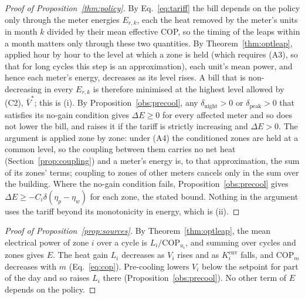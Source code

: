 \documentclass[10pt,a4paper,twocolumn]{article}
\theoremstyle{definition}
\begin{document}
\begin{proof}[Proof of Proposition~\ref{thm:policy}]
By Eq.~\eqref{eq:tariff} the bill depends on the policy only through the meter energies $E_{r,k}$, each the heat removed by the meter's units in month $k$ divided by their mean effective COP, so the timing of the leaps within a month matters only through these two quantities. By Theorem~\ref{thm:optleap}, applied hour by hour to the level at which a zone is held (which requires (A3), so that for long cycles this step is an approximation), each unit's mean power, and hence each meter's energy, decreases as its level rises. A bill that is non-decreasing in every $E_{r,k}$ is therefore minimised at the highest level allowed by (C2), $\bar V^\ast$; this is (i). By Proposition~\ref{obs:precool}, any $\delta_{\text{night}}>0$ or $\delta_{\text{peak}}>0$ that satisfies its no-gain condition gives $\Delta E\ge0$ for every affected meter and so does not lower the bill, and raises it if the tariff is strictly increasing and $\Delta E>0$. The argument is applied zone by zone: under (A4) the conditioned zones are held at a common level, so the coupling between them carries no net heat (Section~\ref{prop:coupling}) and a meter's energy is, to that approximation, the sum of its zones' terms; coupling to zones of other meters cancels only in the sum over the building. Where the no-gain condition fails, Proposition~\ref{obs:precool} gives $\Delta E\ge-C_i\delta(\eta_p-\eta_w)$ for each zone, the stated bound. Nothing in the argument uses the tariff beyond its monotonicity in energy, which is (ii).
\end{proof}

\begin{proof}[Proof of Proposition~\ref{prop:sources}]
By Theorem~\ref{thm:optleap}, the mean electrical power of zone $i$ over a cycle is $L_i/\mathrm{COP}_{u_i}$, and summing over cycles and zones gives $E$. The heat gain $L_i$ decreases as $V_i$ rises and as $K^{\mathrm{env}}_i$ falls, and $\mathrm{COP}_m$ decreases with $m$ (Eq.~\eqref{eq:cop}). Pre-cooling lowers $V_i$ below the setpoint for part of the day and so raises $L_i$ there (Proposition~\ref{obs:precool}). No other term of $E$ depends on the policy.
\end{proof}
\end{document}
